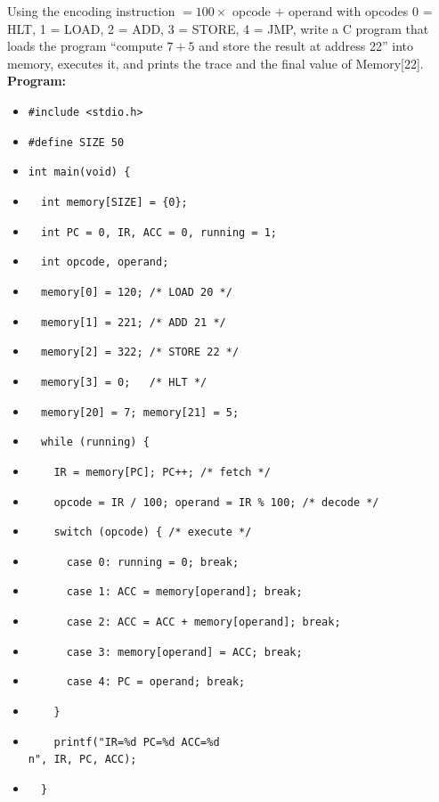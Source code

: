 \documentclass[11pt]{article}
\begin{document}
\begin{exoresolu}
Using the encoding instruction $= 100 \times$ opcode $+$ operand with opcodes 0 = HLT, 1 = LOAD, 2 = ADD, 3 = STORE, 4 = JMP, write a C program that loads the program ``compute $7+5$ and store the result at address 22'' into memory, executes it, and prints the trace and the final value of Memory[22].
\tcblower
\textbf{Program:}
\begin{itemize}
\item[] \texttt{\#include <stdio.h>}
\item[] \texttt{\#define SIZE 50}
\item[] \texttt{int main(void) \{}
\item[] \texttt{\ \ int memory[SIZE] = \{0\};}
\item[] \texttt{\ \ int PC = 0, IR, ACC = 0, running = 1;}
\item[] \texttt{\ \ int opcode, operand;}
\item[] \texttt{\ \ memory[0] = 120; /* LOAD 20 */}
\item[] \texttt{\ \ memory[1] = 221; /* ADD 21 */}
\item[] \texttt{\ \ memory[2] = 322; /* STORE 22 */}
\item[] \texttt{\ \ memory[3] = 0;\ \ \ /* HLT */}
\item[] \texttt{\ \ memory[20] = 7; memory[21] = 5;}
\item[] \texttt{\ \ while (running) \{}
\item[] \texttt{\ \ \ \ IR = memory[PC]; PC++; /* fetch */}
\item[] \texttt{\ \ \ \ opcode = IR / 100; operand = IR \% 100; /* decode */}
\item[] \texttt{\ \ \ \ switch (opcode) \{ /* execute */}
\item[] \texttt{\ \ \ \ \ \ case 0: running = 0; break;}
\item[] \texttt{\ \ \ \ \ \ case 1: ACC = memory[operand]; break;}
\item[] \texttt{\ \ \ \ \ \ case 2: ACC = ACC + memory[operand]; break;}
\item[] \texttt{\ \ \ \ \ \ case 3: memory[operand] = ACC; break;}
\item[] \texttt{\ \ \ \ \ \ case 4: PC = operand; break;}
\item[] \texttt{\ \ \ \ \}}
\item[] \texttt{\ \ \ \ printf("IR=\%d PC=\%d ACC=\%d\\n", IR, PC, ACC);}
\item[] \texttt{\ \ \}}

\end{itemize}
\end{exoresolu}
\end{document}
